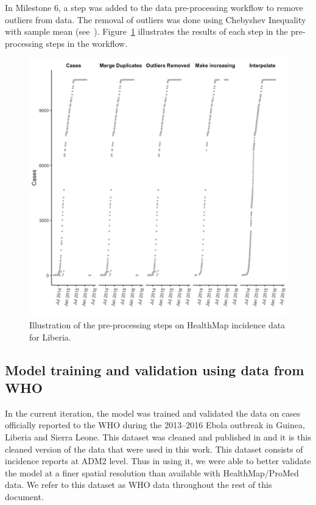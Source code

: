 \documentclass[11pt,]{article}
\begin{document}
In Milestone 6, a step was added to the data pre-processing workflow
to remove outliers from data. The removal of outliers was done using Chebyshev Inequality
with sample mean (see~\cite{saw1984chebyshev}). Figure~\ref{fig:wf_example} illustrates the results of each step in the pre-processing steps in the workflow. 
\begin{figure}
  \centering
  \includegraphics{ms6-figures/liberia-preprocessing.png}
  \caption{Illustration of the pre-processing steps on HealthMap incidence
    data for Liberia.}
  \label{fig:wf_example}
\end{figure}

\subsection{Model training and validation using data from
WHO}\label{model-training-and-validation-using-data-from-who}

In the current iteration, the model was trained and validated the data
on cases officially reported to the WHO during the 2013--2016 Ebola
outbreak in Guinea, Liberia and Sierra Leone. This dataset was cleaned
and published in \citep{garske20160308} and it is this cleaned version
of the data that were used in this work. This dataset consists of
incidence reports at ADM2 level. Thus in using it, we were able to
better validate the model at a finer spatial resolution than available
with HealthMap/ProMed data. We refer to this dataset as WHO data
throughout the rest of this document.
\end{document}
